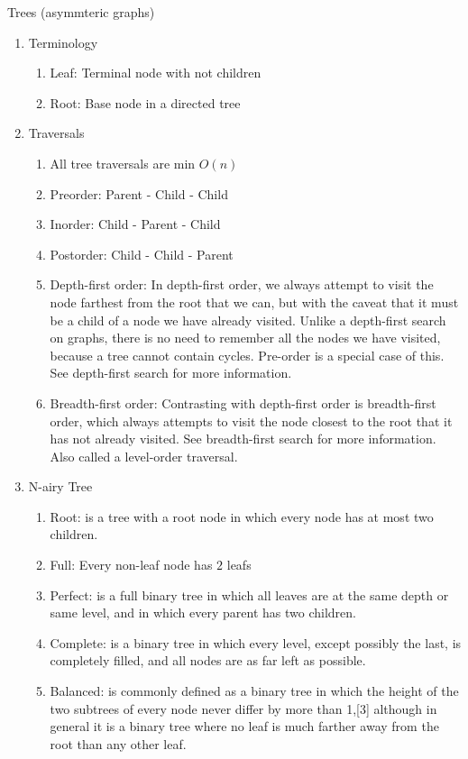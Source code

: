 \documentclass[12pt]{article}
\renewcommand{\=}[1]{\stackrel{#1}{=}} %
\theoremstyle{definition}
\theoremstyle{remark}
\begin{document}
\begin{enumerate}
\begin{enumerate}
    \end{enumerate}
    Trees (asymmteric graphs)
    \begin{enumerate}
    \item Terminology
      \begin{enumerate}
      \item Leaf: Terminal node with not children
      \item Root: Base node in a directed tree
      \end{enumerate}
    \item Traversals
      \begin{enumerate}
      \item All tree traversals are min $O(n)$
      \item Preorder: Parent - Child - Child
      \item Inorder: Child - Parent - Child
      \item Postorder: Child - Child - Parent
      \item Depth-first order:
        In depth-first order, we always attempt to visit the node farthest from the root that we can, but with the caveat that it must be a child of a node we have already visited. Unlike a depth-first search on graphs, there is no need to remember all the nodes we have visited, because a tree cannot contain cycles. Pre-order is a special case of this. See depth-first search for more information.
      \item Breadth-first order:
Contrasting with depth-first order is breadth-first order, which always attempts to visit the node closest to the root that it has not already visited. See breadth-first search for more information. Also called a level-order traversal.
      \end{enumerate}
    \item N-airy Tree
      \begin{enumerate}
      \item Root: is a tree with a root node in which every node has at most two children.
      \item Full: Every non-leaf node has $2$ leafs 
      \item Perfect: is a full binary tree in which all leaves are at the same depth or same level, and in which every parent has two children.
      \item Complete: is a binary tree in which every level, except possibly the last, is completely filled, and all nodes are as far left as possible.
      \item Balanced: is commonly defined as a binary tree in which the height of the two subtrees of every node never differ by more than 1,[3] although in general it is a binary tree where no leaf is much farther away from the root than any other leaf.

\end{enumerate}
\end{enumerate}
\end{enumerate}
\end{document}
